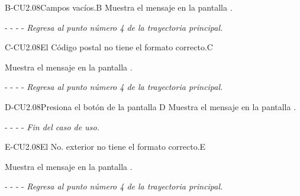 	\begin{UCtrayectoriaA}{B-CU2.08}{Campos vacíos.}{B}
	    \UCpaso[\UCsist]Muestra el mensaje en la pantalla .
	    \item[- -] - - {\em Regresa al punto número 4 de la trayectoria principal.}
	\end{UCtrayectoriaA}
	
		\begin{UCtrayectoriaA}{C-CU2.08}{El Código postal no tiene el formato correcto.}{C}

			\UCpaso[\UCsist] Muestra el mensaje  en la pantalla .
			\item[- -] - - {\em Regresa al punto número 4 de la trayectoria principal.} 
    \end{UCtrayectoriaA}

    
	\begin{UCtrayectoriaA}{D-CU2.08}{Presiona el botón  de la pantalla }{D}
		\UCpaso[\UCsist] Muestra el mensaje  en la pantalla .
		\item[- -] - - {\em Fin del caso de uso.} 
	\end{UCtrayectoriaA}
    
    
    \begin{UCtrayectoriaA}{E-CU2.08}{El No. exterior no tiene el formato correcto.}{E}

			\UCpaso[\UCsist] Muestra el mensaje  en la pantalla .
			\item[- -] - - {\em Regresa al punto número 4 de la trayectoria principal.} 
    \end{UCtrayectoriaA}


